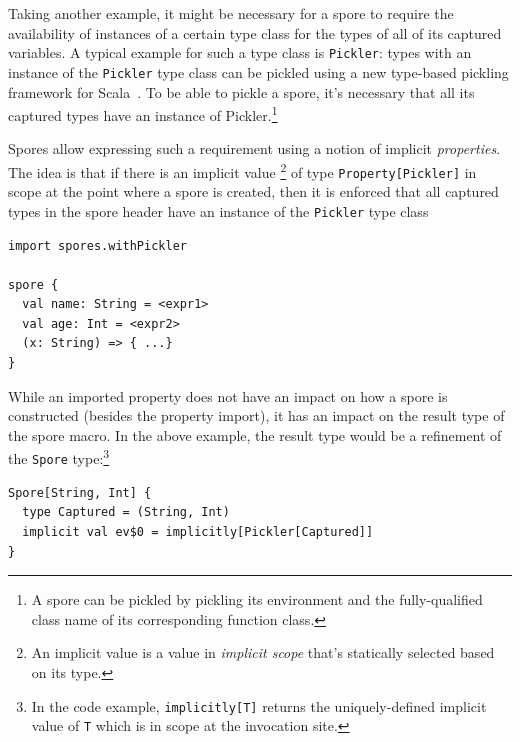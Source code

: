\documentclass{llncs}
\begin{document}
Taking another example, it might be necessary for a spore to require the
availability of instances of a certain type class for the types of all of its
captured variables. A typical example for such a type class is \verb|Pickler|:
types with an instance of the \verb|Pickler| type class can be pickled using a
new type-based pickling framework for Scala~\cite{ScalaPickling}. To be able
to pickle a spore, it's necessary that all its captured types have an instance
of Pickler.\footnote{A spore can be pickled by pickling its environment and
the fully-qualified class name of its corresponding function class.}


Spores allow expressing such a requirement using a notion of implicit {\em
properties}. The idea is that if there is an implicit value
\footnote{An implicit value is a value in \textit{implicit scope} that's statically selected based on its type.}
of type \verb|Property[Pickler]| in scope at the
point where a spore is created, then it is enforced that all captured types in
the spore header have an instance of the \verb|Pickler| type class

\begin{lstlisting}
import spores.withPickler

spore {
  val name: String = <expr1>
  val age: Int = <expr2>
  (x: String) => { ...}
}
\end{lstlisting}

While an imported property does not have an impact on how a spore is
constructed (besides the property import), it has an impact on the result type
of the spore macro. In the above example, the result type would be a
refinement of the \verb|Spore| type:\footnote{In the code example, \texttt{implicitly[T]} returns the uniquely-defined implicit value of \texttt{T} which is in scope at the invocation site.}


\begin{lstlisting}
Spore[String, Int] {
  type Captured = (String, Int)
  implicit val ev$0 = implicitly[Pickler[Captured]]
}
\end{lstlisting}
\end{document}
